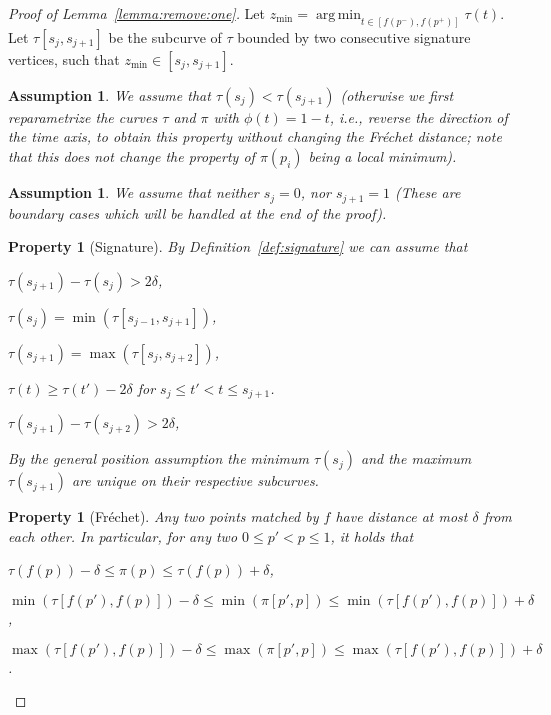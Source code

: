 \documentclass[11pt, letter]{article}
\DeclareMathOperator*{\argmin}{arg\,min}
\newtheorem{assumption}[]{Assumption}
\newtheorem{property}[]{Property}
\newcommand{\lemref}[1]{Lemma~\ref{lemma:#1}}
\newcommand{\defref}[1]{Definition~\ref{def:#1}}
\newcommand{\asslab}[1]{\label{ass:#1}}
\newcommand{\proplab}[1]{\label{prop:#1}}
\newcommand{\Frechet}{Fr\'echet\xspace}
\newcommand{\minSubC}[4]{\ensuremath{\min( #1[#3,#4])}}
\newcommand{\maxSubC}[4]{\ensuremath{\max( #1[#3,#4])}}
\begin{document}
\begin{proof}[Proof of \lemref{remove:one}]
Let $z_{\min}= \argmin_{t \in [f(p^{-}),f(p^{+})]} \tau(t)$. 
Let $\tau[s_j,s_{j+1}]$ be the subcurve of $\tau$ bounded by two
consecutive signature vertices, such that $z_{\min} \in [s_j,s_{j+1}]$.

\begin{assumption}
We assume that $\tau(s_j) < \tau(s_{j+1})$ (otherwise we first reparametrize
the curves $\tau$ and $\pi$ with $\phi(t)=1-t$, i.e., reverse the direction of
the time axis, to obtain this property without changing the \Frechet distance;
note that this does not change the property of $\pi(p_i)$ being a local
minimum).
\asslab{sign:edge:asc}
\end{assumption}

\begin{assumption}
We assume that neither $s_j=0$, nor $s_{j+1}=1$ (These are boundary cases which
will be handled at the end of the proof).
\asslab{inner:sig:edge}
\end{assumption}

\begin{property}[Signature]
By \defref{signature} we can assume that 
\begin{compactenum}[(i)] 
\item $\tau(s_{j+1}) - \tau(s_{j}) > 2\delta$,\label{item:sig:length}
\item $\tau(s_{j}) = \minSubC{\tau}{t}{s_{j-1}}{s_{j+1}}$,\label{item:sig:sj:min}
\item $\tau(s_{j+1}) = \maxSubC{\tau}{t}{s_j}{s_{j+2}}$,\label{item:sig:sj1:max}
\item $\tau(t) \geq \tau(t')-2\delta$ for $s_{j}\leq t' < t \leq
s_{j+1}$.\label{item:sig:descent}
\item $\tau(s_{j+1}) - \tau(s_{j+2}) > 2\delta$,\label{item:sig:length:2}
\end{compactenum}
By the general position assumption the minimum $\tau(s_{j})$ and the maximum
$\tau(s_{j+1})$ are unique on their respective subcurves.
\proplab{signature}
\end{property}

\begin{property}[\Frechet]
Any two points matched by $f$ have distance at most $\delta$ from each other.
In particular, for any two $0\leq p' < p \leq 1$, it holds that
\begin{compactenum}[(i)] 
\item $\tau(f(p)) -\delta \leq \pi(p) 
\leq \tau(f(p)) + \delta$,\label{item:frechet:dist}
\item $\minSubC{\tau}{t}{f(p')}{f(p)} - \delta
\leq \minSubC{\pi}{p}{p'}{p} 
\leq \minSubC{\tau}{t}{f(p')}{f(p)} + \delta$,\label{item:frechet:min}
\item $\maxSubC{\tau}{t}{f(p')}{f(p)} - \delta
\leq \maxSubC{\pi}{p}{p'}{p} 
\leq \maxSubC{\tau}{t}{f(p')}{f(p)} + \delta$.\label{item:frechet:max}
\end{compactenum} 
\proplab{frechet}
\end{property}


\end{proof}
\end{document}
